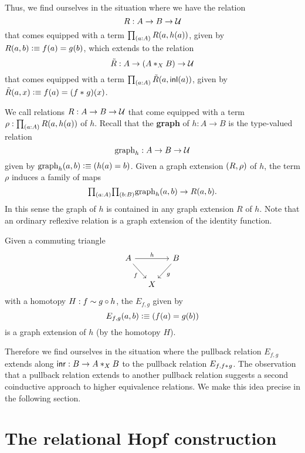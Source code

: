 Thus, we find ourselves in the situation where we have the relation
\begin{equation*}
R:A\to B\to\UU
\end{equation*}
that comes equipped with a term $\prd{a:A}R(a,h(a))$, given by $R(a,b)\defeq f(a)=g(b)$, which extends to the relation
\begin{equation*}
\tilde{R}:A\to (\join[X]{A}{B})\to\UU
\end{equation*}
that comes equipped with a term $\prd{a:A}\tilde{R}(a,\inl(a))$, given by $\tilde{R}(a,x)\defeq f(a)=(\join{f}{g})(x)$.


We call relations $R:A\to B\to \UU$ that come equipped with a term $\rho:\prd{a:A}R(a,h(a))$  of $h$.
Recall that the \textbf{graph} of $h:A\to B$ is the type-valued relation
\begin{equation*}
\mathrm{graph}_h:A\to B\to\UU
\end{equation*}
given by $\mathrm{graph}_h(a,b)\defeq (h(a)=b)$. Given a graph extension $\pairr{R,\rho}$ of $h$, the term $\rho$ induces a family of maps
\begin{equation*}
\prd{a:A}{b:B}\mathrm{graph}_h(a,b)\to R(a,b).
\end{equation*}
In this sense the graph of $h$ is contained in any graph extension $R$ of $h$. Note that an ordinary reflexive relation is a graph extension of the identity function.

Given a commuting triangle 
\begin{equation*}
\begin{tikzcd}[column sep=small]
A \arrow[rr,"h"] \arrow[dr,swap,"f"] & & B \arrow[dl,"g"] \\
& X
\end{tikzcd}
\end{equation*}
with a homotopy $H:f\htpy g\circ h$, the  $E_{f,g}$ given by
\begin{equation*}
E_{f,g}(a,b) \defeq (f(a)=g(b))
\end{equation*}
is a graph extension of $h$ (by the homotopy $H$). 

Therefore we find ourselves in the situation where the pullback relation $E_{f,g}$ extends along $\inr:B\to \join[X]{A}{B}$ to the pullback relation $E_{f,\join{f}{g}}$. The observation that a pullback relation extends to another pullback relation suggests a second coinductive approach to higher equivalence relations. We make this idea precise in the following section.

\section{The relational Hopf construction}

